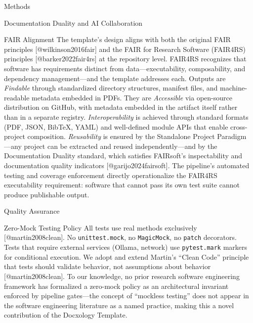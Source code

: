 \documentclass[
  ignorenonframetext,
]{beamer}
\begin{document}
\begin{frame}[fragile]{Methods}
\begin{block}{Documentation Duality and AI Collaboration}
\begin{block}{FAIR Alignment}
\protect{}\label{fair-alignment}
The template's design aligns with both the original FAIR principles
{[}@wilkinson2016fair{]} and the FAIR for Research Software (FAIR4RS)
principles {[}@barker2022fair4rs{]} at the repository level. FAIR4RS
recognizes that software has requirements distinct from
data---executability, composability, and dependency management---and the
template addresses each. Outputs are \emph{Findable} through
standardized directory structures, manifest files, and machine-readable
metadata embedded in PDFs. They are \emph{Accessible} via open-source
distribution on GitHub, with metadata embedded in the artifact itself
rather than in a separate registry. \emph{Interoperability} is achieved
through standard formats (PDF, JSON, BibTeX, YAML) and well-defined
module APIs that enable cross-project composition. \emph{Reusability} is
ensured by the Standalone Project Paradigm---any project can be
extracted and reused independently---and by the Documentation Duality
standard, which satisfies FAIRsoft's inspectability and documentation
quality indicators {[}@garijo2024fairsoft{]}. The pipeline's automated
testing and coverage enforcement directly operationalize the FAIR4RS
executability requirement: software that cannot pass its own test suite
cannot produce publishable output.
\end{block}
\end{block}

\begin{block}{Quality Assurance}
\protect{}\label{quality-assurance}
\begin{block}{Zero-Mock Testing Policy}
\protect{}\label{zero-mock-testing-policy}
All tests use real methods exclusively {[}@martin2008clean{]}. No
\texttt{unittest.mock}, no \texttt{MagicMock}, no \texttt{patch}
decorators. Tests that require external services (Ollama, network) use
\texttt{pytest.mark} markers for conditional execution. We adopt and
extend Martin's ``Clean Code'' principle that tests should validate
behavior, not assumptions about behavior {[}@martin2008clean{]}. To our
knowledge, no prior research software engineering framework has
formalized a zero-mock policy as an architectural invariant enforced by
pipeline gates---the concept of ``mockless testing'' does not appear in
the software engineering literature as a named practice, making this a
novel contribution of the Docxology Template.
\end{block}


\end{block}
\end{frame}
\end{document}
